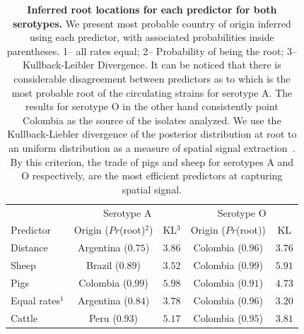 \documentclass[10pt]{article}
\begin{document}
\begin{table}[H]
\caption{
\textbf{Inferred root locations for each predictor for both serotypes.} We present most probable country of origin inferred using each predictor, with associated probabilities inside parentheses. 1-- all rates equal; 2-- Probability of being the root; 3-- Kullback-Leibler Divergence.
It can be noticed that there is considerable disagreement between predictors as to which is the most probable root of the circulating strains for serotype A.
The results for serotype O in the other hand consistently point Colombia as the source of the isolates analyzed.
We use the Kullback-Liebler divergence of the posterior distribution at root to an uniform distribution as a measure of spatial signal extraction~\cite{roots}.
By this criterion, the trade of pigs and sheep  for serotypes A and O respectively, are the most efficient predictors at capturing spatial signal.
}
\begin{center}
\begin{tabular}{lcccc}
\toprule
& \multicolumn{2}{c}{Serotype A}&\multicolumn{2}{c}{Serotype O}\\
Predictor& Origin ($Pr$(root)$^2$)& KL$^3$&Origin ($Pr$(root))& KL\\
\midrule
Distance & Argentina ($0.75$)& $3.86$ & Colombia ($0.96$)& $3.76$\\
Sheep    & Brazil ($0.89$) & $3.52$ & Colombia ($0.99$)& $5.91$\\
Pigs      & Colombia ($0.99$)& $5.98$& Colombia ($0.91$)& $4.73$\\
Equal rates$^1$  & Argentina ($0.84$)& $3.78$ &Colombia  ($0.96$)& $3.20$\\
Cattle   & Peru ($0.93$)& $5.17$ & Colombia ($0.95$)& $3.81$\\
 \bottomrule
\end{tabular}
\end{center}
\begin{flushleft}
\end{flushleft}
\label{tab:roots}
 \end{table}
\end{document}
